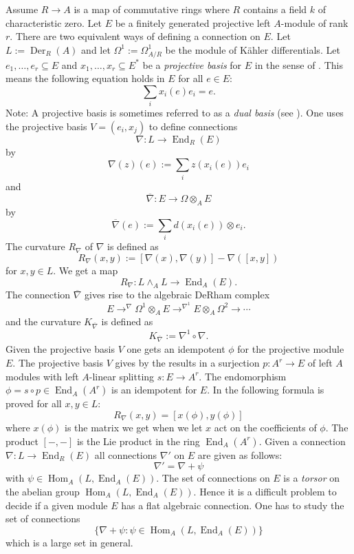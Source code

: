 \documentclass{amsart}
\theoremstyle{plain}
\theoremstyle{definition}
\theoremstyle{remark}
\numberwithin{equation}{theorem}
\begin{document}
Assume ${R}\rightarrow {A}$ is a map of commutative rings where ${R}$ contains a field $k$ of characteristic zero.
Let $E$ be a finitely generated projective left ${A}$-module of rank $r$. 
There are two equivalent ways of defining a connection on 
$E$. Let $L:={\operatorname{Der} }_{R}({A})$ and let $\Omega^1:=\Omega^1_{{A}/{R}}$ be the 
module of K\"{a}hler differentials. Let $e_1,\ldots ,e_r \subseteq E$
and $x_1,\ldots ,x_r \subseteq E^*$ be a \emph{projective basis} for $E$ in the sense of \cite{maa0}.
This means the following equation holds in $E$ for all $e\in E$:
\[ \sum_i x_i(e)e_i=e.\]
Note: A projective basis is sometimes referred to as a \emph{dual basis} (see \cite{anderson}).
One uses the projective basis $V=(e_i,x_j)$ to define connections
\[ \nabla:L\rightarrow {\operatorname{End} }_{R}(E) \]
by
\[ \nabla(z)(e):=\sum_i z(x_i(e))e_i \]
and
\[ \overline{\nabla}:E\rightarrow \Omega\otimes_{A} E\]
by
\[ \overline{\nabla}(e):=\sum_i d(x_i(e))\otimes e_i.\]
The curvature $R_{\nabla}$ of $\nabla$ is defined as 
\[ R_{\nabla}(x,y):= [\nabla(x),\nabla(y)]-\nabla([x,y])\]
for $x,y\in L$. We get a map
\[ R_{\nabla}:L\wedge_{A} L \rightarrow {\operatorname{End} }_{A}(E).\]
The connection $\overline{\nabla}$ gives rise to the algebraic DeRham complex
\[ E\rightarrow^{\nabla} \Omega^1 \otimes_{A} E \rightarrow^{\nabla^1} E\otimes_{A} \Omega^2 \rightarrow \cdots \]
and the curvature $K_{\overline{\nabla}}$ is defined as
\[ K_{\overline{\nabla}}:=\nabla^1 \circ \nabla .\]
Given the projective basis $V$ one gets an idempotent $\phi$ for the projective module $E$. The projective 
basis $V$ gives by the results in \cite{maa0} a surjection $p:{A}^r \rightarrow E$ of left ${A}$ modules with 
left ${A}$-linear splitting $s:E\rightarrow {A}^r$. The endomorphism $\phi=s\circ p\in {\operatorname{End} }_{A}({A}^r)$ is an idempotent 
for $E$. In \cite{maa0} 
the following formula is proved for all $x,y\in L$:
\[ R_{\nabla}(x,y)= [x(\phi), y(\phi)]    \]
where $x(\phi)$ is the matrix we get when we let $x$ act on the coefficients of $\phi$. The product 
$[-,-]$ is the Lie product in the ring ${\operatorname{End} }_{A}({A}^r)$.
Given a connection $\nabla: L\rightarrow {\operatorname{End} }_{R}(E)$ all connections $\nabla'$ on $E$ are given as follows:
\[ \nabla'=\nabla+\psi \]
with $\psi\in {\operatorname{Hom} }_{A}(L, {\operatorname{End} }_{A}(E))$. The set of connections on $E$ is a \emph{torsor} on the abelian 
group ${\operatorname{Hom} }_{A}(L,{\operatorname{End} }_{A}(E))$. 
Hence it is a difficult problem to decide if a given module $E$ has a flat algebraic connection.
One has to study the set of connections
\[ \{ \nabla+\psi: \psi\in {\operatorname{Hom} }_{A}(L,{\operatorname{End} }_{A}(E)) \}\]
which is a large set in general.
\end{document}
